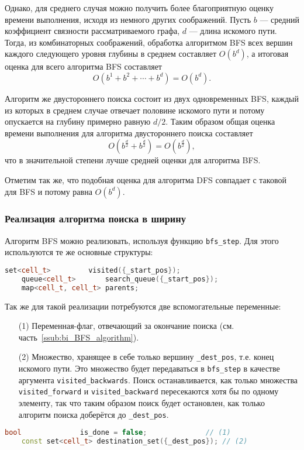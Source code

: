 \documentclass[a4paper, 12pt]{article}
\begin{document}
Однако, для среднего случая можно получить более благоприятную оценку времени выполнения, исходя из немного других соображений. Пусть \({ b }\) --- средний коэффициент связности рассматриваемого графа, \({ d }\) --- длина искомого пути. Тогда, из комбинаторных соображений, обработка алгоритмом BFS всех вершин каждого следующего уровня глубины в среднем составляет \({ O(b^d) }\), а итоговая оценка для всего алгоритма BFS составляет
\[
    O(b^1 + b^2 + \cdots + b^d) = O(b^d).
\]

Алгоритм же двустороннего поиска состоит из двух одновременных BFS, каждый из которых в среднем случае отвечает половине искомого пути и потому опускается на глубину примерно равную \({ d/2 }\). Таким образом общая оценка времени выполнения для алгоритма двустороннего поиска составляет
\[
    O(b^{\frac{d}{2}} + b^{\frac{d}{2}}) = O(b^{\frac{d}{2}}),
\]
что в значительной степени лучше средней оценки для алгоритма BFS.

Отметим так же, что подобная оценка для алгоритма DFS совпадает с таковой для BFS и потому равна \({ O(b^{d}) }\).

\subsubsection{Реализация алгоритма поиска в ширину}
\label{ssub:BFS_implementation}
Алгоритм BFS можно реализовать, используя функцию \verb|bfs_step|. Для этого используются те же основные структуры:
\begin{lstlisting}[language=C++]
    set<cell_t>         visited({_start_pos});
    queue<cell_t>       search_queue({_start_pos});
    map<cell_t, cell_t> parents;
\end{lstlisting}

Так же для такой реализации потребуются две вспомогательные переменные:
\begin{itemize}
    \item[(1)] Переменная-флаг, отвечающий за окончание поиска (см. часть~\ref{ssub:bi_BFS_algorithm}).
    \item[(2)] Множество, хранящее в себе только вершину \verb|_dest_pos|, т.е. конец искомого пути. Это множество будет передаваться в \verb|bfs_step| в качестве аргумента \verb|visited_backwards|. Поиск останавливается, как только множества \verb|visited_forward| и \verb|visited_backward| пересекаются хотя бы по одному элементу,  так что таким образом поиск будет остановлен, как только алгоритм поиска доберётся до \verb|_dest_pos|.
\end{itemize}
\begin{lstlisting}[language=C++]
    bool              is_done = false;              // (1)
    const set<cell_t> destination_set({_dest_pos}); // (2)
\end{lstlisting}
\end{document}
